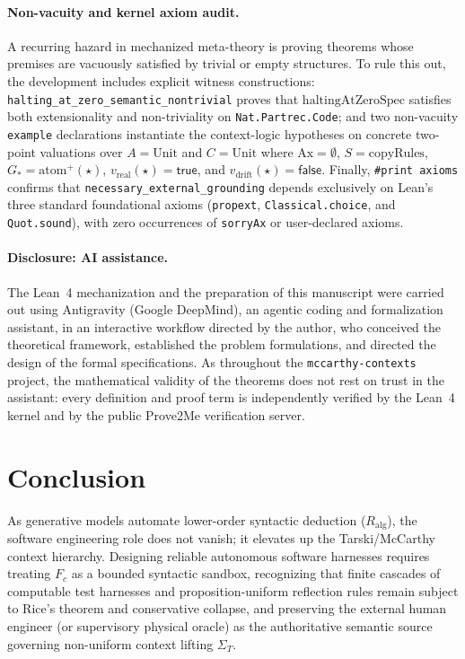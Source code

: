 \documentclass[11pt]{article}
\theoremstyle{plain}
\theoremstyle{definition}
\theoremstyle{remark}
\newcommand{\Ax}{\mathrm{Ax}}
\newcommand{\Ralg}{R_{\mathrm{alg}}}
\begin{document}
\paragraph{Non-vacuity and kernel axiom audit.}
A recurring hazard in mechanized meta-theory is proving theorems whose premises
are vacuously satisfied by trivial or empty structures. To rule this out, the
development includes explicit witness constructions:
\texttt{halting\_at\_zero\_semantic\_nontrivial} proves that
$\mathrm{haltingAtZeroSpec}$ satisfies both extensionality and non-triviality on
\texttt{Nat.Partrec.Code}; and two non-vacuity \texttt{example} declarations
instantiate the context-logic hypotheses on concrete two-point valuations over
$A = \mathrm{Unit}$ and $C = \mathrm{Unit}$ where $\Ax = \emptyset$,
$S = \mathrm{copyRules}$, $G_* = \mathrm{atom}^+(\star)$,
$v_{\mathrm{real}}(\star) = \mathsf{true}$, and
$v_{\mathrm{drift}}(\star) = \mathsf{false}$. Finally, \texttt{\#print axioms}
confirms that \texttt{necessary\_external\_grounding} depends exclusively on
Lean's three standard foundational axioms (\texttt{propext},
\texttt{Classical.choice}, and \texttt{Quot.sound}), with zero occurrences of
\texttt{sorryAx} or user-declared axioms.

\paragraph{Disclosure: AI assistance.}
The Lean~4 mechanization and the preparation of this manuscript were carried out
using Antigravity (Google DeepMind), an agentic coding and formalization
assistant, in an interactive workflow directed by the author, who conceived the
theoretical framework, established the problem formulations, and directed the
design of the formal specifications. As throughout the
\texttt{mccarthy-contexts} project, the mathematical validity of the theorems
does not rest on trust in the assistant: every definition and proof term is
independently verified by the Lean~4 kernel and by the public Prove2Me
verification server.

\section{Conclusion}

As generative models automate lower-order syntactic deduction ($\Ralg$), the
software engineering role does not vanish; it elevates up the Tarski/McCarthy
context hierarchy. Designing reliable autonomous software harnesses requires
treating $F_c$ as a bounded syntactic sandbox, recognizing that finite cascades
of computable test harnesses and proposition-uniform reflection rules remain
subject to Rice's theorem and conservative collapse, and preserving the external
human engineer (or supervisory physical oracle) as the authoritative semantic
source governing non-uniform context lifting $\Sigma_T$.
\end{document}
